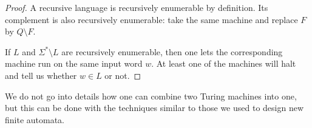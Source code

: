 

\setcounter{section}{8}
\setcounter{subsection}{1}
\setcounter{dfn}{4}

\begin{proof}
A recursive language is recursively enumerable by definition.
Its complement is also recursively enumerable: take the same machine and replace $F$ by $Q \setminus F$.

If $L$ and $\Sigma^* \setminus L$ are recursively enumerable,
then one lets the corresponding machine run on the same input word $w$.
At least one of the machines will halt and tell us whether $w \in L$ or not.
\end{proof}

We do not go into details how one can combine two Turing machines into one,
but this can be done with the techniques similar to those we used to design new finite automata.




